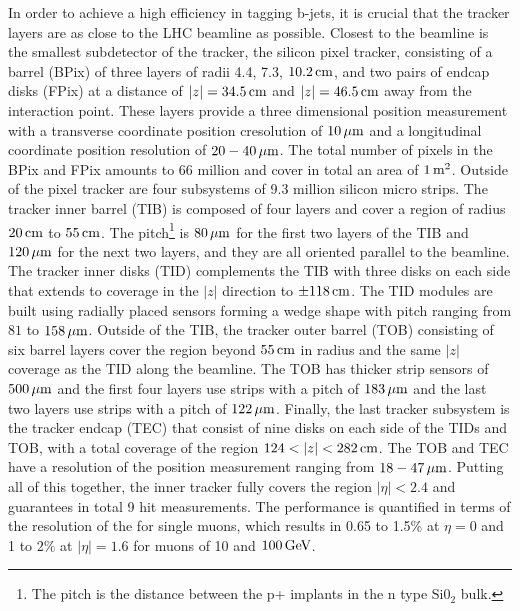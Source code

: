In order to achieve a high efficiency in tagging b-jets, it is crucial that the tracker layers are as close to the LHC beamline as possible. 
Closest to the beamline is the smallest subdetector of the tracker, the silicon pixel tracker, consisting of a barrel (BPix) of three layers of radii 4.4, 7.3, $10.2\,\text{cm}$, and two pairs of endcap disks (FPix) at a distance of $|z|=34.5\,\text{cm}$ and $|z|=46.5\,\text{cm}$ away from the interaction point. 
These layers provide a three dimensional position measurement with a transverse coordinate position cresolution of $10\,\mu\text{m}$ and a longitudinal coordinate position resolution of $20-40\,\mu\text{m}$.
The total number of pixels in the BPix and FPix amounts to 66 million and cover in total an area of $1\,\text{m}^{2}$. 
Outside of the pixel tracker are four subsystems of 9.3 million silicon micro strips. 
The tracker inner barrel (TIB) is composed of four layers and cover a region of radius $20\,\text{cm}$ to $55\,\text{cm}$. 
The pitch\footnote{The pitch is the distance between the p+ implants in the n type $\mathrm{Si0_{2}}$ bulk.} is $80\,\mu\text{m}$ for the first two layers of the TIB and $120\,\mu\text{m}$ for the next two layers, and they are all oriented parallel to the beamline\cite{DAlfonso:2009vko}.
The tracker inner disks (TID) complements the TIB with three disks on each side that extends to coverage in the $|z|$ direction to $\pm118\,\text{cm}$. 
The TID modules are built using radially placed sensors forming a wedge shape with pitch ranging from $81$ to $158\,\mu\text{m}$. 
Outside of the TIB, the tracker outer barrel (TOB) consisting of six barrel layers cover the region beyond $55\,\text{cm}$ in radius and the same $|z|$ coverage as the TID along the beamline.
The TOB has thicker strip sensors of $500\,\mu\text{m}$ and the first four layers use strips with a pitch of $183\,\mu\text{m}$ and the last two layers use strips with a pitch of $122\,\mu\text{m}$.   
Finally, the last tracker subsystem is the tracker endcap (TEC) that consist of nine disks on each side of the TIDs and TOB, with a total coverage of the region $124<|z|<282\cm$. 
The TOB and TEC have a resolution of the position measurement ranging from $18-47\,\mu\text{m}$. 
Putting all of this together, the inner tracker fully covers the region $|\eta|<2.4$ and guarantees in total 9 hit measurements. 
The performance is quantified in terms of the resolution of the \pt for single muons, which results in 0.65 to 1.5\% at $\eta=0$ and 1 to $2\%$ at $|\eta|=1.6$ for muons of 10 and $100\,\text{Ge\hspace{-.08em}V}$. 


